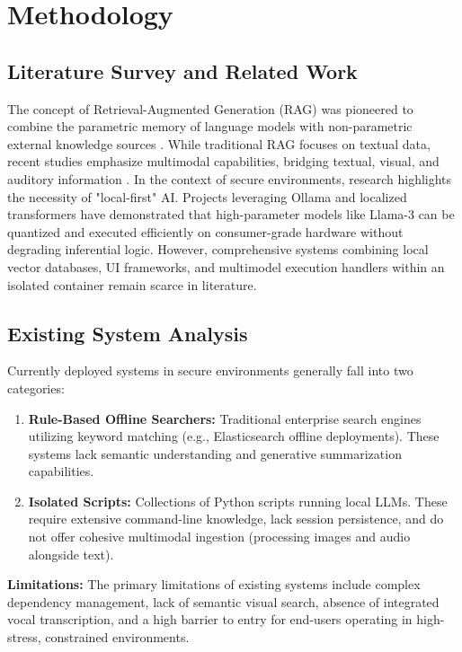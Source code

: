 \section{Methodology}

\subsection{Literature Survey and Related Work}
The concept of Retrieval-Augmented Generation (RAG) was pioneered to combine the parametric memory of language models with non-parametric external knowledge sources \cite{lewis2020retrieval}. While traditional RAG focuses on textual data, recent studies emphasize multimodal capabilities, bridging textual, visual, and auditory information \cite{radford2021learning}. In the context of secure environments, research highlights the necessity of "local-first" AI. Projects leveraging Ollama and localized transformers have demonstrated that high-parameter models like Llama-3 can be quantized and executed efficiently on consumer-grade hardware without degrading inferential logic. However, comprehensive systems combining local vector databases, UI frameworks, and multimodel execution handlers within an isolated container remain scarce in literature.

\subsection{Existing System Analysis}
Currently deployed systems in secure environments generally fall into two categories:
\begin{enumerate}
    \item \textbf{Rule-Based Offline Searchers:} Traditional enterprise search engines utilizing keyword matching (e.g., Elasticsearch offline deployments). These systems lack semantic understanding and generative summarization capabilities.
    \item \textbf{Isolated Scripts:} Collections of Python scripts running local LLMs. These require extensive command-line knowledge, lack session persistence, and do not offer cohesive multimodal ingestion (processing images and audio alongside text).
\end{enumerate}
\textbf{Limitations:} The primary limitations of existing systems include complex dependency management, lack of semantic visual search, absence of integrated vocal transcription, and a high barrier to entry for end-users operating in high-stress, constrained environments.

